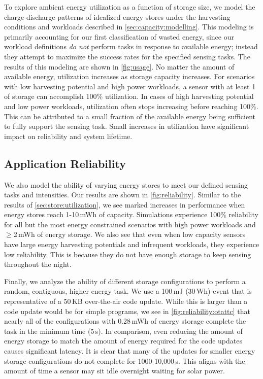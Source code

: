 To explore ambient energy utilization as a function of storage size, we
model the charge-discharge patterns of idealized energy stores under
the harvesting conditions and workloads described in \cref{sec:capacity:modelling}.
This modeling is primarily accounting for our first classification of
wasted energy, since our workload definitions \textit{do not} perform
tasks in response to available energy; instead they attempt to maximize the success
rates for the specified sensing tasks.
The results of this modeling are shown in \cref{fig:usage}. No matter
the amount of available energy, utilization increases as
storage capacity increases. For scenarios with low harvesting potential and high
power workloads, a sensor with at least 1\ssi{\milli\Wh} of storage can accomplish 100\% utilization.
In cases of
high harvesting potential and low power workloads, utilization often
stops increasing before reaching 100\%. This
can be attributed to a small fraction of the available energy being sufficient
to fully support the sensing task.
Small increases in utilization
have significant impact on reliability and system lifetime.

\subsection{Application Reliability}
\label{sec:store:reliability}

We also model the ability of varying energy stores to meet our defined
sensing tasks and intensities. Our results are
shown in \cref{fig:reliability}. 
Similar to the results of \cref{sec:store:utilization}, we see marked
increases in performance when energy stores reach 1-10\,mWh
of capacity.
Simulations experience 100\% reliability for all but
the most energy constrained scenarios with high power workloads and
$\geq$2\,mWh of energy storage.
We also see that even when low capacity sensors
have large energy harvesting potentials and infrequent workloads, they experience low
reliability.
This is because they
do not have enough storage to keep sensing throughout the night.

Finally, we analyze the ability of different storage configurations to perform a
random, contiguous, higher energy task. We use a 100\,mJ (30\,\textmu Wh) event that is representative of a
50\,KB over-the-air code update. While this is larger than a code update would be
for simple programs,
we see in \cref{fig:reliability:otattc} that nearly all of the configurations with
0.28\,mWh of energy storage complete the task in the minimum time (5\,s). In comparison,
even reducing the amount of energy storage to match the amount of energy
required for the code updates causes significant latency. It is clear that
many of the updates for smaller energy storage configurations
do not complete for 1000-10,000\,s.
This aligns with the amount of time a sensor may sit
idle overnight waiting for solar power.

